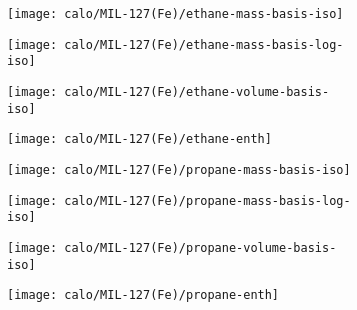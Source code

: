 \begin{figure}[H]

    \begin{subfigure}{0.25\textwidth}
        \texttt{[image: calo/MIL-127(Fe)/ethane-mass-basis-iso]}%
        \label{appx:fig:shaping:mil127c2h6mass}
    \end{subfigure}%
    \begin{subfigure}{0.25\textwidth}
        \texttt{[image: calo/MIL-127(Fe)/ethane-mass-basis-log-iso]}%
        \label{appx:fig:shaping:mil127c2h6masslog}
    \end{subfigure}%
    \begin{subfigure}{0.25\textwidth}
        \texttt{[image: calo/MIL-127(Fe)/ethane-volume-basis-iso]}%
        \label{appx:fig:shaping:mil127c2h6volume}
    \end{subfigure}%
    \begin{subfigure}{0.25\textwidth}
        \texttt{[image: calo/MIL-127(Fe)/ethane-enth]}%
        \label{appx:fig:shaping:mil127c2h6enth}
    \end{subfigure}%

    \begin{subfigure}{0.25\textwidth}
        \texttt{[image: calo/MIL-127(Fe)/propane-mass-basis-iso]}%
        \label{appx:fig:shaping:mil127c3h8mass}
    \end{subfigure}%
    \begin{subfigure}{0.25\textwidth}
        \texttt{[image: calo/MIL-127(Fe)/propane-mass-basis-log-iso]}%
        \label{appx:fig:shaping:mil127c3h8masslog}
    \end{subfigure}%
    \begin{subfigure}{0.25\textwidth}
        \texttt{[image: calo/MIL-127(Fe)/propane-volume-basis-iso]}%
        \label{appx:fig:shaping:mil127c3h8volume}
    \end{subfigure}%
    \begin{subfigure}{0.25\textwidth}
        \texttt{[image: calo/MIL-127(Fe)/propane-enth]}%
        \label{appx:fig:shaping:mil127c3h8enth}
    \end{subfigure}%


\end{figure}
